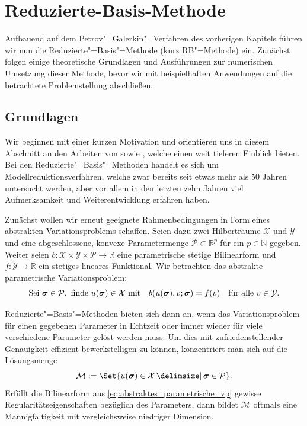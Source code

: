 \documentclass[../main.tex]{subfiles}
\begin{document}
\chapter{Reduzierte-Basis-Methode} %
\label{chapter:rbm}

Aufbauend auf dem Petrov"=Galerkin"=Verfahren des vorherigen Kapitels führen wir nun die Reduzierte"=Basis"=Methode (kurz RB"=Methode) ein.
Zunächst folgen einige theoretische Grundlagen und Ausführungen zur numerischen Umsetzung dieser Methode, bevor wir mit  beispielhaften Anwendungen auf die betrachtete Problemstellung abschließen.

\section{Grundlagen} %
\label{sub:grb:rb:grundlagen}

Wir beginnen mit einer kurzen Motivation und orientieren uns in diesem Abschnitt an den Arbeiten von \textcite{Rozza2008} sowie \textcite{Patera:2007un}, welche einen weit tieferen Einblick bieten.
Bei den Reduzierte"=Basis"=Methoden handelt es sich um Modellreduktionsverfahren, welche zwar bereits seit etwas mehr als 50 Jahren untersucht werden, aber vor allem in den letzten zehn Jahren viel Aufmerksamkeit und Weiterentwicklung erfahren haben.

Zunächst wollen wir erneut geeignete Rahmenbedingungen in Form eines abstrakten Variationsproblems schaffen.
Seien dazu zwei Hilberträume $\mathcal X$ und $\mathcal Y$ und eine abgeschlossene, konvexe Parametermenge $\mathcal P \subset \mathbb{R}^{p}$ für ein $p \in \mathbb{N}$ gegeben.
Weiter seien $b \colon \mathcal X \times \mathcal Y \times \mathcal P \to \mathbb{R}$ eine parametrische stetige Bilinearform und $f \colon \mathcal Y \to \mathbb{R}$ ein stetiges lineares Funktional.
Wir betrachten das abstrakte parametrische Variationsproblem:
\begin{equation}
\label{eq:abstraktes_parametrische_vp}
    \text{Sei } \bm \sigma \in \mathcal P, \text{ finde } u(\bm \sigma) \in \mathcal X \text{ mit} \quad b(u(\bm \sigma), v; \bm \sigma) = f(v) \quad \fa v \in \mathcal Y.
\end{equation}

Reduzierte"=Basis"=Methoden bieten sich dann an, wenn das Variationsproblem für einen gegebenen Parameter in Echtzeit oder immer wieder für viele verschiedene Parameter gelöst werden muss.
Um dies mit zufriedenstellender Genauigkeit effizient bewerkstelligen zu können, konzentriert man sich auf die Lösungsmenge
\begin{equation}
\label{eq:stetige_loesungsmenge}
    \mathcal M := \Set{u(\bm \sigma) \in \mathcal X \given \bm \sigma \in \mathcal P}.
\end{equation}
Erfüllt die Bilinearform aus \cref{eq:abstraktes_parametrische_vp} gewisse Regularitätseigenschaften bezüglich des Parameters, dann bildet $\mathcal M$ oftmals eine Mannigfaltigkeit mit vergleichsweise niedriger Dimension.
\end{document}
